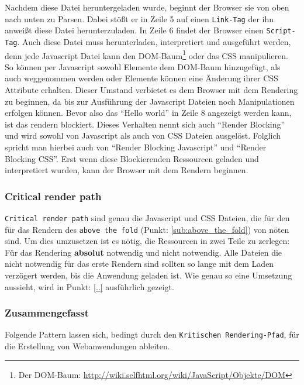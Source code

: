 			Nachdem diese Datei heruntergeladen wurde, beginnt der Browser sie von oben nach unten zu Parsen. Dabei stößt er in Zeile 5 auf einen \texttt{Link-Tag} der ihn anweißt diese Datei herunterzuladen. In Zeile 6 findet der Browser einen \texttt{Script-Tag}. Auch diese Datei muss herunterladen, interpretiert und ausgeführt werden, denn jede Javascript Datei kann den DOM-Baum\footnote{Der DOM-Baum: \url{http://wiki.selfhtml.org/wiki/JavaScript/Objekte/DOM}} oder das CSS manipulieren. So können per Javascript sowohl Elemente dem DOM-Baum hinzugefügt, als auch weggenommen werden oder Elemente können eine Änderung ihrer CSS Attribute erhalten. Dieser Umstand verbietet es dem Browser mit dem Rendering zu beginnen, da bis zur Ausführung der Javascript Dateien noch Manipulationen erfolgen können.
			Bevor also das "`Hello world"' in Zeile 8 angezeigt werden kann, ist das rendern blockiert. Dieses Verhalten nennt sich auch "`Render Blocking"' und wird sowohl von Javascript als auch von CSS Dateien ausgelöst. Folglich spricht man hierbei auch von "`Render Blocking Javascript"' und "`Render Blocking CSS"'. Erst wenn diese Blockierenden Ressourcen geladen und interpretiert wurden, kann der Browser mit dem Rendern beginnen. 


		\subsubsection{Critical render path} %
		\label{ssub:critical_render_path}
			
			\texttt{Critical render path} sind genau die Javascript und CSS Dateien, die für den für das Rendern des \texttt{above the fold} (Punkt: \ref{sub:above_the_fold}) von nöten sind. Um dies umzusetzen ist es nötig, die Ressourcen in zwei Teile zu zerlegen: Für das Rendering \textbf{absolut} notwendig und nicht notwendig. Alle Dateien die nicht notwendig für das erste Rendern sind sollten so lange mit dem Laden verzögert werden, bis die Anwendung geladen ist. Wie genau so eine Umsetzung aussieht, wird in Punkt: \ref{..} ausführlich gezeigt.


		\subsubsection{Zusammengefasst} %
		\label{ssub:zusammengefasst}
		  Folgende Pattern lassen sich, bedingt durch den \texttt{Kritischen Rendering-Pfad}, für die Erstellung von Webanwendungen ableiten.

